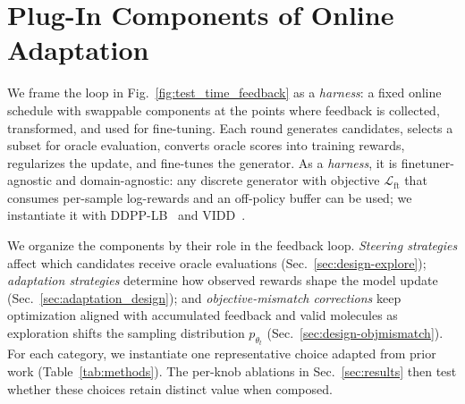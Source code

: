 \section{Plug-In Components of Online Adaptation} 
\label{sec:design-space}

We frame the loop in Fig.~\ref{fig:test_time_feedback} as a \emph{harness}: a fixed online schedule with swappable components at the points where feedback is collected, transformed, and used for fine-tuning. Each round generates candidates, selects a subset for oracle evaluation, converts oracle scores into training rewards, regularizes the update, and fine-tunes the generator. As a \emph{harness}, it is finetuner-agnostic and domain-agnostic: any discrete generator with objective $\mathcal{L}_{\text{ft}}$ that consumes per-sample log-rewards and an off-policy buffer can be used; we instantiate it with DDPP-LB~\citep{rector-brooksSteeringMaskedDiscrete2024} and VIDD~\citep{suIterativeDistillationRewardGuided2025}.

We organize the components by their role in the feedback loop. \emph{Steering strategies} affect which candidates receive oracle evaluations (Sec.~\ref{sec:design-explore}); \emph{adaptation strategies} determine how observed rewards shape the model update (Sec.~\ref{sec:adaptation_design}); and \emph{objective-mismatch corrections} keep optimization aligned with accumulated feedback and valid molecules as exploration shifts the sampling distribution $p_{\theta_t}$ (Sec.~\ref{sec:design-objmismatch}). For each category, we instantiate one representative choice adapted from prior work (Table~\ref{tab:methods}). The per-knob ablations in Sec.~\ref{sec:results} then test whether these choices retain distinct value when composed.

